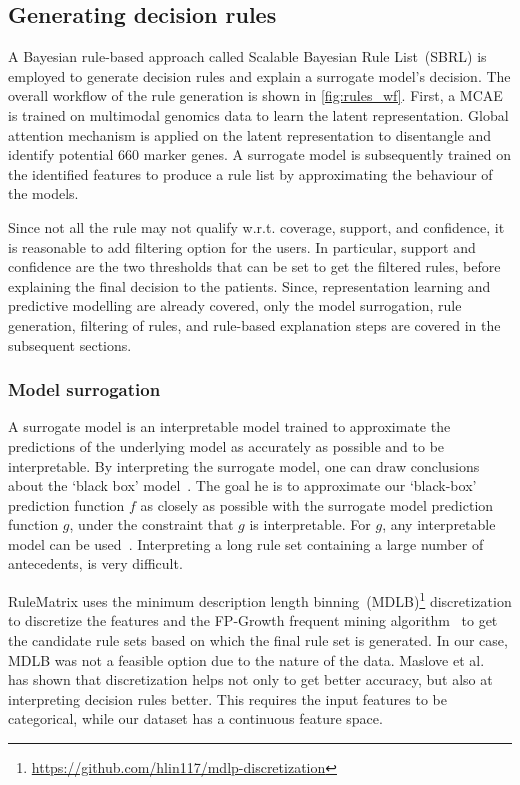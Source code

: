 \subsection{Generating decision rules}
A Bayesian rule-based approach called Scalable Bayesian Rule List~(SBRL) is employed to generate decision rules and explain a surrogate model's decision. The overall workflow of the rule generation is shown in \cref{fig:rules_wf}. First, a MCAE is trained on multimodal genomics data to learn the latent representation. Global attention mechanism is applied on the latent representation to disentangle and identify potential 660 marker genes. A surrogate model is subsequently trained on the identified features to produce a rule list by approximating the behaviour of the  models. 

\hspace*{3.5mm} Since not all the rule may not qualify w.r.t. coverage, support, and confidence, it is reasonable to add filtering option for the users. In particular, support and confidence are the two thresholds that can be set to get the filtered rules, before explaining the final decision to the patients. Since, representation learning and predictive modelling are already covered, only the model surrogation, rule generation, filtering of rules, and rule-based explanation steps are covered in the subsequent sections. 

\subsubsection{Model surrogation}
A surrogate model is an interpretable model trained to approximate the predictions of the underlying model as accurately as possible and to be interpretable. By interpreting the surrogate model, one can draw conclusions about the `black box' model~\cite{molnar2019interpretable}. The goal he is to approximate our `black-box' prediction function $f$ as closely as possible with the surrogate model prediction function $g$, under the constraint that $g$ is interpretable. For $g$, any interpretable model can be used~\cite{molnar2019interpretable}. Interpreting a long rule set containing a large number of antecedents, is very difficult.  

\hspace*{3.5mm} RuleMatrix uses the minimum description length binning~(MDLB)\footnote{\url{https://github.com/hlin117/mdlp-discretization}} discretization to discretize the features and the FP-Growth frequent mining algorithm~\cite{han2000mining} to get the candidate rule sets based on which the final rule set is generated. In our case, MDLB was not a feasible option due to the nature of the data. Maslove et al.~\cite{maslove2013discretization} has shown that discretization helps not only to get better accuracy, but also at interpreting  decision rules better. This requires the input features to be categorical, while our dataset has a continuous feature space. 

